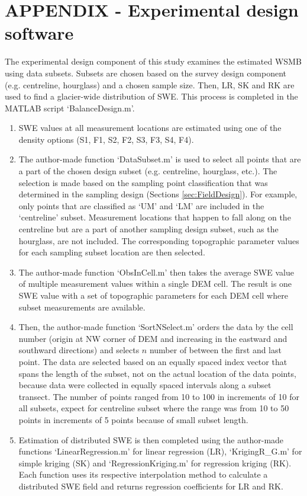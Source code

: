 \documentclass[12pt]{article}
\begin{document}
\section*{APPENDIX - Experimental design software}
\label{app:Subsets}
The experimental design component of this study examines the estimated WSMB using data subsets. Subsets are chosen based on the survey design component (e.g. centreline, hourglass) and a chosen sample size. Then, LR, SK and RK are used to find a glacier-wide distribution of SWE. This process is completed in the MATLAB script `BalanceDesign.m'. 
\begin{enumerate}
\item SWE values at all measurement locations are estimated using one of the density options (S1, F1, S2, F2, S3, F3, S4, F4).
\item The author-made function `DataSubset.m' is used to select all points that are a part of the chosen design subset (e.g. centreline, hourglass, etc.). The selection is made based on the sampling point classification that was determined in the sampling design (Sections \ref{sec:FieldDesign}). For example, only points that are classified as `UM' and `LM' are included in the `centreline' subset. Measurement locations that happen to fall along on the centreline but are a part of another sampling design subset, such as the hourglass, are not included. The corresponding topographic parameter values for each sampling subset location are then selected. 
\item The author-made function `ObsInCell.m' then takes the average SWE value of multiple measurement values within a single DEM cell. The result is one SWE value with a set of topographic parameters for each DEM cell where subset measurements are available.
\item Then, the author-made function `SortNSelect.m' orders the data by the cell number (origin at NW corner of DEM and increasing in the eastward and southward directions) and selects $n$ number of between the first and last point. The data are selected based on an equally spaced index vector that spans the length of the subset, not on the actual location of the data points, because data were collected in equally spaced intervals along a subset transect. The number of points ranged from 10 to 100 in increments of 10 for all subsets, expect for centreline subset where the range was from 10 to 50 points in increments of 5 points because of small subset length. 
\item Estimation of distributed SWE is then completed using the author-made functions `LinearRegression.m' for linear regression (LR), `KrigingR\_G.m' for simple kriging (SK) and `RegressionKriging.m' for regression kriging (RK). Each function uses its respective interpolation method to calculate a distributed SWE field and returns regression coefficients for LR and RK. 
\end{enumerate}
\end{document}
